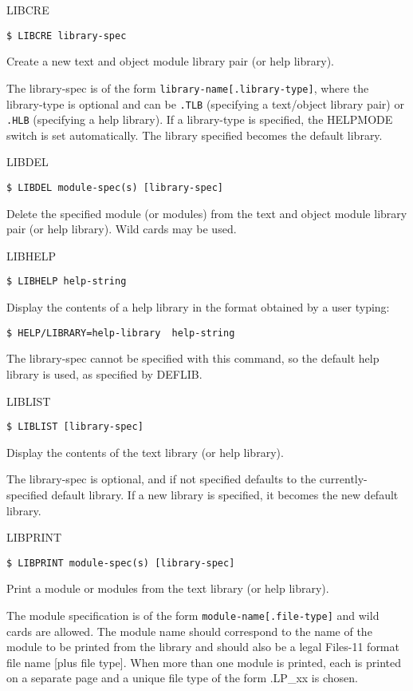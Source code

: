 \begin{list}{}{\setlength{\labelwidth}{\numlen}\setlength{\leftmargin}{\numlen}
\addtolength{\leftmargin}{\labelsep}}
\item[LIBCRE]
\begin{verbatim}
$ LIBCRE library-spec
\end{verbatim}
Create a new text and object module library pair (or help
library).

The library-spec is of the form {\tt library-name[.library-type]}, where the
library-type is optional and can be {\tt .TLB} (specifying a text/object
library pair) or {\tt .HLB} (specifying a help library).
If a library-type is specified, the HELPMODE switch is set
automatically.
The library specified becomes the default library.

\item[LIBDEL]
\begin{verbatim}
$ LIBDEL module-spec(s) [library-spec]
\end{verbatim}
Delete the specified module (or modules) from the text and
object module library pair (or help library).
Wild cards may be used.

\item[LIBHELP]
\begin{verbatim}
$ LIBHELP help-string
\end{verbatim}
Display the contents of a help library in the format
obtained by a user typing:
\begin{verbatim}
$ HELP/LIBRARY=help-library  help-string
\end{verbatim}
The library-spec cannot be specified with this command, so the
default help library is used, as specified by DEFLIB.

\item[LIBLIST]
\begin{verbatim}
$ LIBLIST [library-spec]
\end{verbatim}
Display the contents of the text library (or help library).

The library-spec is optional, and if not specified defaults to the
currently-specified default library.
If a new library is specified, it becomes the new default library.

\item[LIBPRINT]
\begin{verbatim}
$ LIBPRINT module-spec(s) [library-spec]
\end{verbatim}
Print a module or modules from the text library (or help
library).

The module specification is of the form {\tt module-name[.file-type]}
and wild cards are allowed.
The module name should correspond to the
name of the module to be printed from the library and should
also be a legal Files-11 format file name [plus file type].
When more than one module is printed, each is printed on
a separate page and a unique file type of the form .LP\_xx is
chosen.


\end{list}
